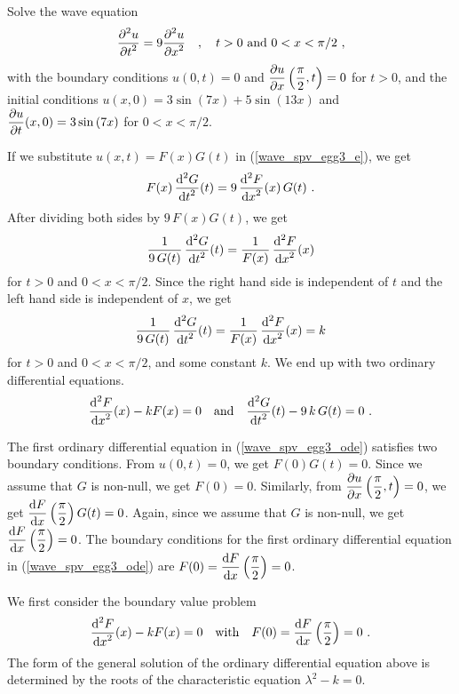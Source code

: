 \begin{egg}
Solve the wave equation
\begin{equation} \label{wave_spv_egg3_e}
\frac{\displaystyle \partial^{2}{u}} {\displaystyle \partial t^{2}} = 9 \frac{\displaystyle \partial^{2}{u}} {\displaystyle \partial x^{2}} \quad ,
\quad t > 0 \ \text{and} \ 0 < x < \pi/2 \ , 
\end{equation}
with the boundary conditions
$u(0,t) = 0$ and $\displaystyle \frac{\partial{u}}{\partial x}\left(\frac{\pi}{2},t\right) = 0$
for $t > 0$, and the initial conditions
$\displaystyle u(x,0) = 3 \sin\left(7 x\right) + 5 \sin\left(13 x\right)$
and
$\displaystyle \frac{\partial{u}}{\partial t}(x,0) = 3 \sin\left(7 x\right)$
for $0 < x < \pi/2$.

If we substitute $u(x,t) = F(x)G(t)$ in (\ref{wave_spv_egg3_e}), we get
\[
F(x)\,\frac{\displaystyle \mathrm{d}^{2}{G}} {\displaystyle \mathrm{d}{t}^{2}}(t) = 9\, \frac{\displaystyle \mathrm{d}^{2}{F}} {\displaystyle \mathrm{d}{x}^{2}}(x)\, G(t) \ .
\]
After dividing both sides by $9\,F(x)G(t)$, we get
\[
\frac{1}{9\,G(t)} \, \frac{\displaystyle \mathrm{d}^{2}{G}} {\displaystyle \mathrm{d}{t}^{2}}(t) = \frac{1}{F(x)}\, \frac{\displaystyle \mathrm{d}^{2}{F}} {\displaystyle \mathrm{d}{x}^{2}}(x)
\]
for $t>0$ and $0<x<\pi/2$.
Since the right hand side is independent of $t$ and the left hand side
is independent of $x$, we get
\[
\frac{1}{9\,G(t)} \, \frac{\displaystyle \mathrm{d}^{2}{G}} {\displaystyle \mathrm{d}{t}^{2}}(t) = \frac{1}{F(x)}\,
\frac{\displaystyle \mathrm{d}^{2}{F}} {\displaystyle \mathrm{d}{x}^{2}}(x) = k
\]
for $t>0$ and $0<x<\pi/2$, and some constant $k$.  We end up with two
ordinary differential equations.
\begin{equation} \label{wave_spv_egg3_ode}
\frac{\displaystyle \mathrm{d}^{2}{F}} {\displaystyle \mathrm{d}{x}^{2}}(x) -k F(x) = 0 \quad \text{and}
\quad \frac{\displaystyle \mathrm{d}^{2}{G}} {\displaystyle \mathrm{d}{t}^{2}}(t) - 9\,k\,G(t) = 0 \ .
\end{equation}

The first ordinary differential equation in (\ref{wave_spv_egg3_ode})
satisfies two boundary conditions.   From $u(0,t) = 0$, we get
$F(0)G(t)=0$.  Since we assume that $G$ is non-null, we get
$F(0)=0$.  Similarly, from
$\displaystyle \frac{\partial{u}}{\partial x}\left(\frac{\pi}{2},t\right) = 0$, we get
$\displaystyle \frac{\mathrm{d}F}{\mathrm{d}{x}}\left(\frac{\pi}{2}\right)G(t)=0$.
Again, since we assume that $G$ is non-null, we get
$\displaystyle \frac{\mathrm{d}F}{\mathrm{d}{x}}\left(\frac{\pi}{2}\right)=0$.  The
boundary conditions for the first ordinary differential equation in
(\ref{wave_spv_egg3_ode}) are
$\displaystyle F(0)=\frac{\mathrm{d}F}{\mathrm{d}{x}}\left(\frac{\pi}{2}\right)=0$. 

We first consider the boundary value problem
\begin{equation} \label{wave_spv_egg3_bvp}
\frac{\displaystyle \mathrm{d}^{2}{F}} {\displaystyle \mathrm{d}{x}^{2}}(x) -k F(x) = 0 \quad \text{with} \quad
F(0)=\frac{\mathrm{d}F}{\mathrm{d}{x}}\left(\frac{\pi}{2}\right)=0 \  .
\end{equation}
The form of the general solution of the ordinary differential equation
above is determined by the roots of the characteristic equation
$\displaystyle \lambda^2-k=0$.


\end{egg}
